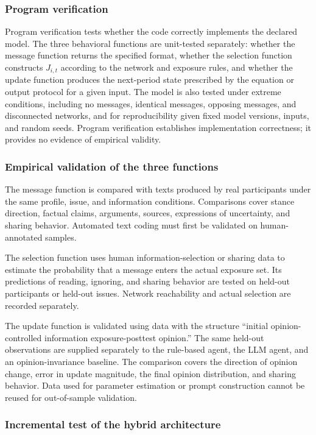 \documentclass[11pt,a4paper]{article}
\begin{document}
\subsubsection{Program verification}

Program verification tests whether the code correctly implements the declared model. The three behavioral functions are unit-tested separately: whether the message function returns the specified format, whether the selection function constructs $J_{i,t}$ according to the network and exposure rules, and whether the update function produces the next-period state prescribed by the equation or output protocol for a given input. The model is also tested under extreme conditions, including no messages, identical messages, opposing messages, and disconnected networks, and for reproducibility given fixed model versions, inputs, and random seeds. Program verification establishes implementation correctness; it provides no evidence of empirical validity.

\subsubsection{Empirical validation of the three functions}

The message function is compared with texts produced by real participants under the same profile, issue, and information conditions. Comparisons cover stance direction, factual claims, arguments, sources, expressions of uncertainty, and sharing behavior. Automated text coding must first be validated on human-annotated samples.

The selection function uses human information-selection or sharing data to estimate the probability that a message enters the actual exposure set. Its predictions of reading, ignoring, and sharing behavior are tested on held-out participants or held-out issues. Network reachability and actual selection are recorded separately.

The update function is validated using data with the structure ``initial opinion-controlled information exposure-posttest opinion.'' The same held-out observations are supplied separately to the rule-based agent, the LLM agent, and an opinion-invariance baseline. The comparison covers the direction of opinion change, error in update magnitude, the final opinion distribution, and sharing behavior. Data used for parameter estimation or prompt construction cannot be reused for out-of-sample validation.

\subsubsection{Incremental test of the hybrid architecture}
\end{document}
